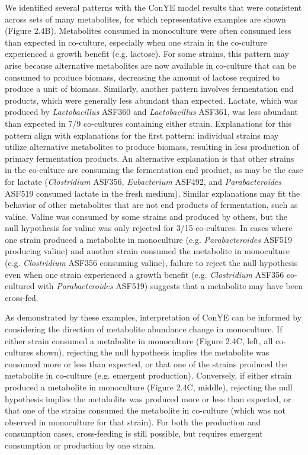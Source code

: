 \documentclass[11pt,twocolumn,notitlepage,openany,twoside]{book}
\begin{document}
\begin{refsection}
We identified several patterns with the ConYE model results that were consistent across sets of many metabolites, for which representative examples are shown (Figure 2.4B). Metabolites consumed in monoculture were often consumed less than expected in co-culture, especially when one strain in the co-culture experienced a growth benefit (e.g. lactose). For some strains, this pattern may arise because alternative metabolites are now available in co-culture that can be consumed to produce biomass, decreasing the amount of lactose required to produce a unit of biomass. Similarly, another pattern involves fermentation end products, which were generally less abundant than expected. Lactate, which was produced by \textit{Lactobacillus} ASF360 and \textit{Lactobacillus} ASF361, was less abundant than expected in 7/9 co-cultures containing either strain. Explanations for this pattern align with explanations for the first pattern; individual strains may utilize alternative metabolites to produce biomass, resulting in less production of primary fermentation products. An alternative explanation is that other strains in the co-culture are consuming the fermentation end product, as may be the case for lactate (\textit{Clostridium} ASF356, \textit{Eubacterium} ASF492, and \textit{Parabacteroides} ASF519 consumed lactate in the fresh medium). Similar explanations may fit the behavior of other metabolites that are not end products of fermentation, such as valine. Valine was consumed by some strains and produced by others, but the null hypothesis for valine was only rejected for 3/15 co-cultures. In cases where one strain produced a metabolite in monoculture (e.g. \textit{Parabacteroides} ASF519 producing valine) and another strain consumed the metabolite in monoculture (e.g. \textit{Clostridium} ASF356 consuming valine), failure to reject the null hypothesis even when one strain experienced a growth benefit (e.g. \textit{Clostridium} ASF356 co-cultured with \textit{Parabacteroides} ASF519) suggests that a metabolite may have been cross-fed.

As demonstrated by these examples, interpretation of ConYE can be informed by considering the direction of metabolite abundance change in monoculture. If either strain consumed a metabolite in monoculture (Figure 2.4C, left, all co-cultures shown), rejecting the null hypothesis implies the metabolite was consumed more or less than expected, or that one of the strains produced the metabolite in co-culture (e.g. emergent production). Conversely, if either strain produced a metabolite in monoculture (Figure 2.4C, middle), rejecting the null hypothesis implies the metabolite was produced more or less than expected, or that one of the strains consumed the metabolite in co-culture (which was not observed in monoculture for that strain). For both the production and consumption cases, cross-feeding is still possible, but requires emergent consumption or production by one strain.


\end{refsection}
\end{document}
